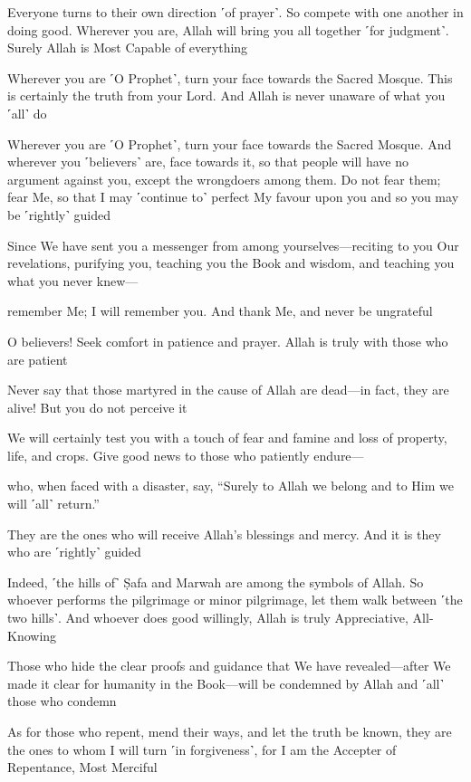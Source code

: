 Everyone turns to their own direction ˹of prayer˺. So compete with one another in doing good. Wherever you are, Allah will bring you all together ˹for judgment˺. Surely Allah is Most Capable of everything

Wherever you are ˹O Prophet˺, turn your face towards the Sacred Mosque. This is certainly the truth from your Lord. And Allah is never unaware of what you ˹all˺ do

Wherever you are ˹O Prophet˺, turn your face towards the Sacred Mosque. And wherever you ˹believers˺ are, face towards it, so that people will have no argument against you, except the wrongdoers among them. Do not fear them; fear Me, so that I may ˹continue to˺ perfect My favour upon you and so you may be ˹rightly˺ guided

Since We have sent you a messenger from among yourselves—reciting to you Our revelations, purifying you, teaching you the Book and wisdom, and teaching you what you never knew—

remember Me; I will remember you. And thank Me, and never be ungrateful

O believers! Seek comfort in patience and prayer. Allah is truly with those who are patient

Never say that those martyred in the cause of Allah are dead—in fact, they are alive! But you do not perceive it

We will certainly test you with a touch of fear and famine and loss of property, life, and crops. Give good news to those who patiently endure—

who, when faced with a disaster, say, “Surely to Allah we belong and to Him we will ˹all˺ return.”

They are the ones who will receive Allah’s blessings and mercy. And it is they who are ˹rightly˺ guided

Indeed, ˹the hills of˺ Ṣafa and Marwah are among the symbols of Allah. So whoever performs the pilgrimage or minor pilgrimage, let them walk between ˹the two hills˺. And whoever does good willingly, Allah is truly Appreciative, All-Knowing

Those who hide the clear proofs and guidance that We have revealed—after We made it clear for humanity in the Book—will be condemned by Allah and ˹all˺ those who condemn

As for those who repent, mend their ways, and let the truth be known, they are the ones to whom I will turn ˹in forgiveness˺, for I am the Accepter of Repentance, Most Merciful

